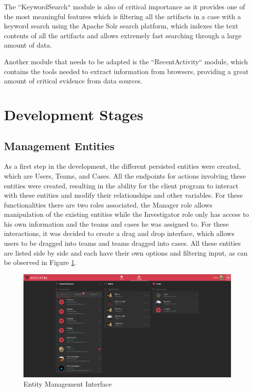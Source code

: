 The ``KeywordSearch`` module is also of critical importance as it provides one of the most meaningful features which is filtering all the artifacts in a case with a keyword
search using the Apache Solr search platform, which indexes the text contents of all the artifacts and allows extremely fast searching through a large amount of data.  

Another module that needs to be adapted is the ``RecentActivity`` module, which contains the tools needed to extract information from browsers, providing a great amount of
critical evidence from data sources.

\section{Development Stages}

\subsection{Management Entities}

As a first step in the development, the different persisted entities were created, which are Users, Teams, and Cases. All the endpoints for actions involving these 
entities were created, resulting in the ability for the client program to interact with these entities and modify their relationships and other variables.
For these functionalities there are two roles associated, the Manager role allows manipulation of the existing entities while the Investigator role only has access to his
own information and the teams and cases he was assigned to. For these interactions, it was decided to create a drag and drop interface, which allows users to be dragged into
teams and teams dragged into cases. All these entities are listed side by side and each have their own options and filtering input, as can be observed in Figure \ref{fig:users}.

\begin{figure}[h]
 \centering
 \includegraphics[width=1\linewidth]{imgs/users.png}
 \caption{Entity Management Interface}
 \label{fig:users}
\end{figure}

